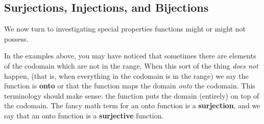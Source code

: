 \documentclass[10pt,]{memoir}
\newcommand{\terminology}[1]{\textbf{#1}}
\theoremstyle{plain}
\theoremstyle{definition}
\theoremstyle{definition}
\theoremstyle{definition}
\numberwithin{equation}{chapter}
\begin{document}
\subsection[Surjections, Injections, and Bijections]{Surjections, Injections, and Bijections}\label{subsec_surj-inj-bij}

      We now turn to investigating special properties functions might or might not possess.
\par

      In the examples above, you may have noticed that sometimes there are elements of the codomain which are not in the range. When this sort of the thing \emph{does not} happen, (that is, when everything in the codomain is in the range) we say the function is
      \terminology{onto} or that the function maps the domain \emph{onto} the codomain. This terminology should make sense: the function puts the domain (entirely) on top of the codomain. The fancy math term for an onto function is a
      \terminology{surjection}, and we say that an onto function is a
      \terminology{surjective} function.
\par
\end{document}
